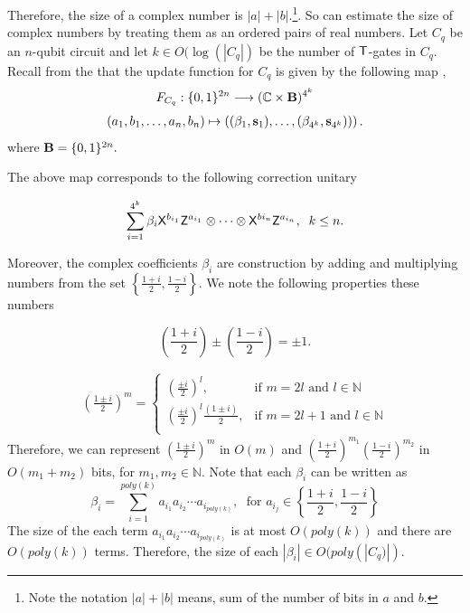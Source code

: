 Therefore, the size of a complex number is $|a|+|b|.$\footnote{Note the notation $|a|+|b|$ means, sum of the number of bits in $a$ and $b.$}. So can estimate the size of complex numbers by treating them as an ordered pairs of real numbers. Let $C_q$ be an $n$-qubit circuit and let $k\in O(\log(|C_q|)$ be the number of ${\sf T}$-gates in $C_q.$ Recall from the that the update function for $C_q$ is given by the following map ,
\begin{equation}
\begin{aligned}
 F_{C_q}: \{0,1\}^{2n}\longrightarrow  (\mathbb{C} \times {\bf B})^{4^k}
 \end{aligned}
\end{equation}
\begin{equation}
\begin{aligned}
 (a_1,b_1,\ldots, a_n,b_n) \mapsto \left((\beta_1, {\bf s}_1),\dots, (\beta_{4^k}, {\bf s}_{4^k}))\right).
\end{aligned}
\end{equation}      
where  ${\bf B}=\{0,1\}^{2n}.$ 

The above map corresponds to the following correction unitary 

 \begin{equation*}
\sum_{i=1}^{4^k} \beta_i {\sf X}^{b_{i_1}} {\sf Z}^{a_{i_1}}\otimes \cdots \otimes {\sf X}^{b{i_n}} {\sf Z}^{a_{i_n}},\;  \; k\leq n.
\end{equation*}
 
 Moreover, the complex coefficients $\beta_i$ are construction by adding and multiplying numbers from the set $\left\{\frac{1+i}{2},\frac{1-i}{2}\right\}.$ We note the following properties these numbers


 $$\left(\frac{1+i}{2}\right)\pm \left(\frac{1-i}{2}\right)=\pm1.$$

 
\begin{equation*}
 \begin{aligned}
  \left(\frac{1\pm i}{2}\right)^m= 
\begin{cases}
    (\frac{\pm i}{2})^l,& \text{if } m=2l \text{ and } l\in\mathbb{N}\\
    (\frac{\pm i}{2})^l\frac{(1\pm i)}{2},              & \text{if } m=2l+1 \text{ and } l\in\mathbb{N}\\
\end{cases}
\end{aligned}
 \end{equation*}
 Therefore, we can represent $\left(\frac{1\pm i}{2}\right)^m$ in $O(m)$ and $\left(\frac{1+ i}{2}\right)^{m_1} \left(\frac{1- i}{2}\right)^{m_2}$ in $O(m_1+m_2)$ bits, for $m_1,m_2\in\mathbb{N}.$ 
 Note that each $\beta_i$ can be written as 
 $$\beta_i=\sum_{i=1}^{poly(k)}a_{i_1}a_{i_2}\cdots a_{i_{poly(k)}},\; \mbox{ for } a_{i_j}\in\left\{\frac{1+i}{2},\frac{1-i}{2}\right\}$$
The size of the each term $a_{i_1}a_{i_2}\cdots a_{i_{poly(k)}}$ is at most $O(poly(k))$ and there are $O(poly(k))$ terms. Therefore, the size of each $|\beta_i|\in O(poly(|C_q)|).$


